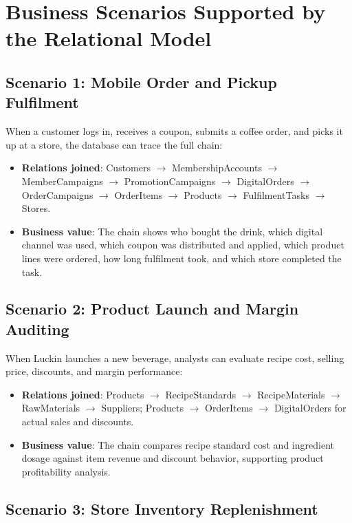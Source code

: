 \documentclass[12pt,a4paper]{article}
\begin{document}
\section{Business Scenarios Supported by the Relational Model}

\subsection{Scenario 1: Mobile Order and Pickup Fulfilment}

When a customer logs in, receives a coupon, submits a coffee order, and picks it up at a store, the database can trace the full chain:
\begin{itemize}[leftmargin=1.3em]
  \item \textbf{Relations joined}: Customers $\rightarrow$ MembershipAccounts $\rightarrow$ MemberCampaigns $\rightarrow$ PromotionCampaigns $\rightarrow$ DigitalOrders $\rightarrow$ OrderCampaigns $\rightarrow$ OrderItems $\rightarrow$ Products $\rightarrow$ FulfilmentTasks $\rightarrow$ Stores.
  \item \textbf{Business value}: The chain shows who bought the drink, which digital channel was used, which coupon was distributed and applied, which product lines were ordered, how long fulfilment took, and which store completed the task.
\end{itemize}

\subsection{Scenario 2: Product Launch and Margin Auditing}

When Luckin launches a new beverage, analysts can evaluate recipe cost, selling price, discounts, and margin performance:
\begin{itemize}[leftmargin=1.3em]
  \item \textbf{Relations joined}: Products $\rightarrow$ RecipeStandards $\rightarrow$ RecipeMaterials $\rightarrow$ RawMaterials $\rightarrow$ Suppliers; Products $\rightarrow$ OrderItems $\rightarrow$ DigitalOrders for actual sales and discounts.
  \item \textbf{Business value}: The chain compares recipe standard cost and ingredient dosage against item revenue and discount behavior, supporting product profitability analysis.
\end{itemize}

\subsection{Scenario 3: Store Inventory Replenishment}
\end{document}
